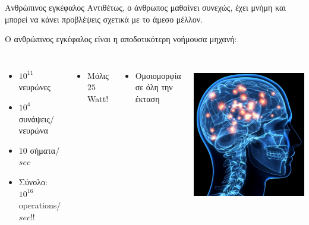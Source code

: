 \documentclass[11pt,center]{beamer}
\begin{document}
  \begin{frame}{Ανθρώπινος εγκέφαλος}
	  Αντιθέτως, ο άνθρωπος μαθαίνει \alert{συνεχώς}, έχει \alert{μνήμη} και μπορεί να κάνει 			        \alert{προβλέψεις} σχετικά με το άμεσο μέλλον.

	  \pause
	  \vfill
	  Ο ανθρώπινος εγκέφαλος είναι η αποδοτικότερη νοήμουσα μηχανή:
	  \begin{columns}
		  \vspace{-1em}
		  \begin{itemize}
			  \item<2->[--] $10^{11}$ νευρώνες
			  \item<2->[--] $10^4$ συνάψεις/νευρώνα
			  \item<2->[--] $10$ σήματα/$sec$
			  \item<2->[--] \alert{Σύνολο:} $10^{16}$ operations/$sec$!!
		  \end{itemize}
		  \vspace{+1em}
		  \begin{itemize}
			  \item<3->[--] Μόλις $25$ Watt!
		  \end{itemize}
		  \vspace{+1em}
		  \begin{itemize}
			  \item<4->[--] Ομοιομορφία σε όλη την έκταση
		  \end{itemize}

		  \\
		  \includegraphics[width=0.95 \textwidth]{../pics/brain.jpeg}
	  \end{columns}
  \end {frame}
\end{document}
